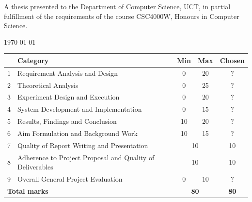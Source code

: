 \begin{titlepage}

\begin{center}
 A thesis presented to the Department of Computer Science, UCT, in partial fulfillment of the requirements of the course CSC4000W, Honours in Computer Science.
\end{center}
\vspace{1cm}

{\large \today}\\[1cm] %
\begin{tabular}{|c|l|c|c|c|}
 \hline
   & \textbf{Category} & \textbf{Min} & \textbf{Max} & \textbf{Chosen} \\
 \hline
 1 & Requirement Analysis and Design & 0 & 20 & ? \\
 \hline
 2 & Theoretical Analysis & 0 & 25 & ? \\
 \hline
 3 & Experiment Design and Execution & 0 & 20 & ? \\
 \hline
 4 & System Development and Implementation & 0 & 15 & ? \\
 \hline
 5 & Results, Findings and Conclusion & 10 & 20 & ? \\
 \hline
 6 & Aim Formulation and Background Work & 10 & 15 & ? \\
 \hline
 7 & Quality of Report Writing and Presentation & \multicolumn{2}{|c|}{10} & 10 \\
 \hline
 8 & Adherence to Project Proposal and Quality of Deliverables & \multicolumn{2}{|c|}{10} & 10 \\
 \hline
 9 & Overall General Project Evaluation & 0 & 10 & ? \\
 \hline
 \multicolumn{2}{|l|}{\textbf{Total marks}} & \multicolumn{2}{|c|}{\textbf{80}} & \textbf{80} \\
 \hline
\end{tabular}

 

\vfill %

\end{titlepage}
